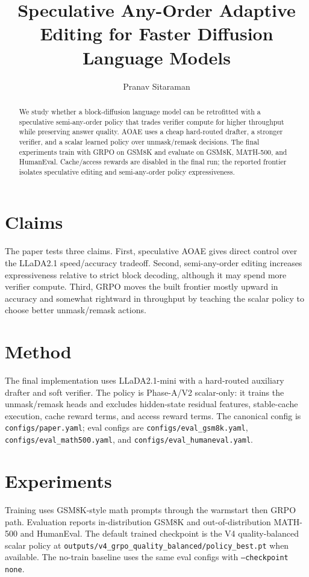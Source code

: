 \documentclass{article}
\title{Speculative Any-Order Adaptive Editing for Faster Diffusion Language Models}
\author{Pranav Sitaraman}
\date{}
\begin{document}
\maketitle

\begin{abstract}
We study whether a block-diffusion language model can be retrofitted with a
speculative semi-any-order policy that trades verifier compute for higher
throughput while preserving answer quality. AOAE uses a cheap hard-routed
drafter, a stronger verifier, and a scalar learned policy over unmask/remask
decisions. The final experiments train with GRPO on GSM8K and evaluate on
GSM8K, MATH-500, and HumanEval. Cache/access rewards are disabled in the final
run; the reported frontier isolates speculative editing and semi-any-order
policy expressiveness.
\end{abstract}

\section{Claims}

The paper tests three claims. First, speculative AOAE gives direct control over
the LLaDA2.1 speed/accuracy tradeoff. Second, semi-any-order editing increases
expressiveness relative to strict block decoding, although it may spend more
verifier compute. Third, GRPO moves the built frontier mostly upward in
accuracy and somewhat rightward in throughput by teaching the scalar policy to
choose better unmask/remask actions.

\section{Method}

The final implementation uses LLaDA2.1-mini with a hard-routed auxiliary drafter
and soft verifier. The policy is Phase-A/V2 scalar-only: it trains the
unmask/remask heads and excludes hidden-state residual features, stable-cache
execution, cache reward terms, and access reward terms. The canonical config is
\texttt{configs/paper.yaml}; eval configs are \texttt{configs/eval\_gsm8k.yaml},
\texttt{configs/eval\_math500.yaml}, and \texttt{configs/eval\_humaneval.yaml}.

\section{Experiments}

Training uses GSM8K-style math prompts through the warmstart then GRPO path.
Evaluation reports in-distribution GSM8K and out-of-distribution MATH-500 and
HumanEval. The default trained checkpoint is the V4 quality-balanced scalar
policy at \texttt{outputs/v4\_grpo\_quality\_balanced/policy\_best.pt} when
available. The no-train baseline uses the same eval configs with
\texttt{--checkpoint none}.
\end{document}
